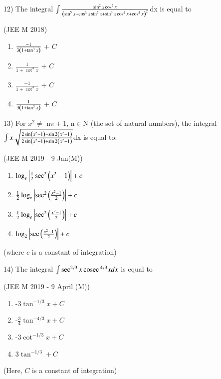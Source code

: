 \documentclass[journal,12pt,twocolumn]{IEEEtran}
\theoremstyle{remark}
\begin{document}
12)
	 The integral $\int\frac{\sin^2x\cos^2x}{\left(\sin^5x+\cos^3x\sin^2x+\sin^3x\cos^2x+\cos^5x\right)^2}$dx is equal to

		\hfill{(JEE M 2018)}
		
		\begin{multicols}{2}
			\begin{enumerate}[label=(\alph*)]
				\item $\frac{-1}{3\left(1+\tan ^3x\right)}$ + $C$
				\item $\frac{1}{1+\cot ^3x}$ + $C$
				\item $\frac{-1}{1+\cot ^3x}$ + $C$
				\item $\frac{1}{3\left(1+\tan ^3x\right)}$ + $C$
			\end{enumerate}
		\end{multicols}
		
13)
	 For $x^2\neq$ n$\pi+1$, n$\in$N (the set of natural numbers), the integral $\int x\sqrt{\frac{2\sin \left(x^2-1\right)-\sin 2\left(x^2-1\right)}{2\sin \left(x^2-1\right)+\sin 2\left(x^2-1\right)}}$dx is equal to:

		\hfill{(JEE M 2019 - 9 Jan(M))}

		\begin{multicols}{1}
			\begin{enumerate}[label=(\alph*)]
				\item $\log_e\left\vert\frac{1}{2}\sec ^2\left(x^2-1\right)\right\vert + c$
				\item $\frac{1}{2}\log_e\left\vert\sec ^2\left(\frac{x^2-1}{2}\right)\right\vert + c$
				\item $\frac{1}{2}\log_e\left\vert\sec ^2\left(\frac{x^2-1}{2}\right)\right\vert + c$
				\item $\log_2\left\vert\sec \left(\frac{x^2-1}{2}\right)\right\vert + c$
			\end{enumerate}
		\end{multicols}
		(where $c$ is a constant of integration)

14)
	 The integral $\int \sec ^{2/3}x\,\text{cosec}\, ^{4/3}x dx$ is equal to

		\hfill{(JEE M 2019 - 9 April (M))}

		\begin{multicols}{2}
			\begin{enumerate}[label=(\alph*)]
				\item -3$\tan ^{-1/3}x+C$
				\item -$\frac{3}{4}\tan ^{-4/3}x+C$
				\item -3$\cot ^{-1/3}x+C$
				\item 3$\tan ^{-1/3}+C$
			\end{enumerate}
		\end{multicols}
		(Here, $C$ is a constant of integration)
\end{document}
